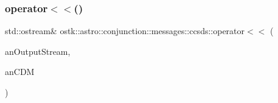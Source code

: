 \subsubsection{\texorpdfstring{operator$<$$<$()}{operator<<()}}
{\footnotesize\ttfamily std\+::ostream\& ostk\+::astro\+::conjunction\+::messages\+::ccsds\+::operator$<$$<$ (\begin{DoxyParamCaption}\item[{std\+::ostream \&}]{an\+Output\+Stream,  }\item[{const \hyperlink{classostk_1_1astro_1_1conjunction_1_1messages_1_1ccsds_1_1_c_d_m}{C\+DM} \&}]{an\+C\+DM }\end{DoxyParamCaption})}

